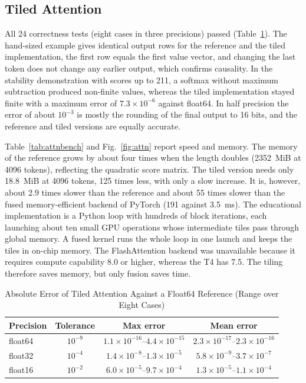 \documentclass[conference]{IEEEtran}
\begin{document}
\subsection{Tiled Attention}
All 24 correctness tests (eight cases in three precisions) passed (Table~\ref{tab:attnerr}). The hand-sized example gives identical output rows for the reference and the tiled implementation, the first row equals the first value vector, and changing the last token does not change any earlier output, which confirms causality. In the stability demonstration with scores up to 211, a softmax without maximum subtraction produced non-finite values, whereas the tiled implementation stayed finite with a maximum error of $7.3\times10^{-6}$ against float64. In half precision the error of about $10^{-3}$ is mostly the rounding of the final output to 16 bits, and the reference and tiled versions are equally accurate.

Table~\ref{tab:attnbench} and Fig.~\ref{fig:attn} report speed and memory. The memory of the reference grows by about four times when the length doubles (2352~MiB at 4096 tokens), reflecting the quadratic score matrix. The tiled version needs only 18.8~MiB at 4096 tokens, 125 times less, with only a slow increase. It is, however, about 2.9 times slower than the reference and about 55 times slower than the fused memory-efficient backend of PyTorch (191 against 3.5~ms). The educational implementation is a Python loop with hundreds of block iterations, each launching about ten small GPU operations whose intermediate tiles pass through global memory. A fused kernel runs the whole loop in one launch and keeps the tiles in on-chip memory. The FlashAttention backend was unavailable because it requires compute capability 8.0 or higher, whereas the T4 has 7.5. The tiling therefore saves memory, but only fusion saves time.

\begin{table}[!t]
\caption{Absolute Error of Tiled Attention Against a Float64 Reference (Range over Eight Cases)}
\label{tab:attnerr}
\centering
\scriptsize
\setlength{\tabcolsep}{2pt}
\begin{tabular}{lccc}
\toprule
Precision & Tolerance & Max error & Mean error \\
\midrule
float64 & $10^{-9}$ & $1.1\times10^{-16}$--$4.4\times10^{-15}$ & $2.3\times10^{-17}$--$2.3\times10^{-16}$ \\
float32 & $10^{-4}$ & $1.4\times10^{-8}$--$1.3\times10^{-5}$ & $5.8\times10^{-9}$--$3.7\times10^{-7}$ \\
float16 & $10^{-2}$ & $6.0\times10^{-5}$--$9.7\times10^{-4}$ & $1.3\times10^{-5}$--$1.1\times10^{-4}$ \\
\bottomrule
\end{tabular}
\end{table}
\end{document}
